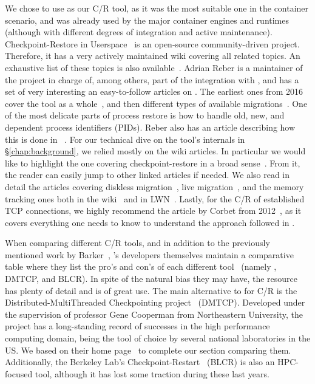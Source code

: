 We chose to use \criu as our C/R tool, as it was the most suitable one in the container scenario, and was already used by the major container engines and runtimes (although with different degrees of integration and active maintenance).
Checkpoint-Restore in Userspace~\cite{criu-main-page} is an open-source community-driven project.
Therefore, it has a very actively maintained wiki covering all related topics.
An exhaustive list of these topics is also available~\cite{criu-all}.
Adrian Reber is a maintainer of the project in charge of, among others, part of the integration with \runc, and has a set of very interesting an easy-to-follow articles on \criu.
The earliest ones from 2016 cover the tool as a whole~\cite{Reber2016}, and then different types of available migrations~\cite{Reber2016b}.
One of the most delicate parts of process restore is how to handle old, new, and dependent process identifiers (PIDs).
Reber also has an article describing how this is done in \criu~\cite{Reber2019}.
For our technical dive on the tool's internals in \S\ref{chap:background}, we relied mostly on the wiki articles.
In particular we would like to highlight the one covering checkpoint-restore in a broad sense~\cite{criu-checkpoint}.
From it, the reader can easily jump to other linked articles if needed.
We also read in detail the articles covering diskless migration~\cite{criu-diskless}, live migration~\cite{criu-live-migration}, and the memory tracking ones both in the wiki~\cite{criu-memory-tracking} and in LWN~\cite{criu-memory-tracking-lwn}.
Lastly, for the C/R of established TCP connections, we highly recommend the article by Corbet from 2012~\cite{Corbet12}, as it covers everything one needs to know to understand the approach followed in \criu.

When comparing different C/R tools, and in addition to the previously mentioned work by Barker~\cite{Barker2014}, \criu's developers themselves maintain a comparative table where they list the pro's and con's of each different tool~\cite{criu-comparison} (namely \criu, DMTCP, and BLCR).
In spite of the natural bias they may have, the resource has plenty of detail and is of great use.
The main alternative to \criu for C/R is the Distributed-MultiThreaded Checkpointing project~\cite{Ansel2009} (DMTCP).
Developed under the supervision of professor Gene Cooperman from Northeastern University, the project has a long-standing record of successes in the high performance computing domain, being the tool of choice by several national laboratories in the US.
We based on their home page~\cite{dmtcp} to complete our section comparing them.
Additionally, the Berkeley Lab's Checkpoint-Restart~\cite{blcr} (BLCR) is also an HPC-focused tool, although it has lost some traction during these last years. 

